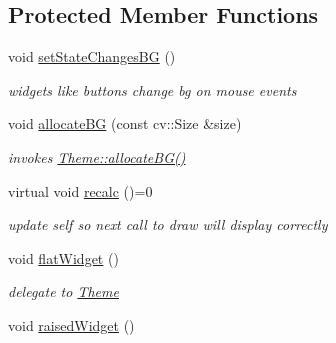 \subsection*{Protected Member Functions}
\begin{DoxyCompactItemize}
\item 
void \hyperlink{classcanvascv_1_1Widget_a5b94411875ff9f65b4da857e3ee2734a}{set\+State\+Changes\+BG} ()\hypertarget{classcanvascv_1_1Widget_a5b94411875ff9f65b4da857e3ee2734a}{}\label{classcanvascv_1_1Widget_a5b94411875ff9f65b4da857e3ee2734a}

\begin{DoxyCompactList}\small\item\em widgets like buttons change bg on mouse events \end{DoxyCompactList}\item 
void \hyperlink{classcanvascv_1_1Widget_a0102a02ca60dad4dafc4bb1d0bba046b}{allocate\+BG} (const cv\+::\+Size \&size)\hypertarget{classcanvascv_1_1Widget_a0102a02ca60dad4dafc4bb1d0bba046b}{}\label{classcanvascv_1_1Widget_a0102a02ca60dad4dafc4bb1d0bba046b}

\begin{DoxyCompactList}\small\item\em invokes \hyperlink{classcanvascv_1_1Theme_a5f8c0e382d893419f9097bbc07e04130}{Theme\+::allocate\+B\+G()} \end{DoxyCompactList}\item 
virtual void \hyperlink{classcanvascv_1_1Widget_a1d6d9b43efb60d591280cf5997380731}{recalc} ()=0\hypertarget{classcanvascv_1_1Widget_a1d6d9b43efb60d591280cf5997380731}{}\label{classcanvascv_1_1Widget_a1d6d9b43efb60d591280cf5997380731}

\begin{DoxyCompactList}\small\item\em update self so next call to \textquotesingle{}draw\textquotesingle{} will display correctly \end{DoxyCompactList}\item 
void \hyperlink{classcanvascv_1_1Widget_ae84a6b77b417f8b9eb6d2e4f8e0fde60}{flat\+Widget} ()\hypertarget{classcanvascv_1_1Widget_ae84a6b77b417f8b9eb6d2e4f8e0fde60}{}\label{classcanvascv_1_1Widget_ae84a6b77b417f8b9eb6d2e4f8e0fde60}

\begin{DoxyCompactList}\small\item\em delegate to \hyperlink{classcanvascv_1_1Theme}{Theme} \end{DoxyCompactList}\item 
void \hyperlink{classcanvascv_1_1Widget_a09cf72b5592a91ef0ff91a59c7d1852d}{raised\+Widget} ()\hypertarget{classcanvascv_1_1Widget_a09cf72b5592a91ef0ff91a59c7d1852d}{}\label{classcanvascv_1_1Widget_a09cf72b5592a91ef0ff91a59c7d1852d}


\end{DoxyCompactItemize}
